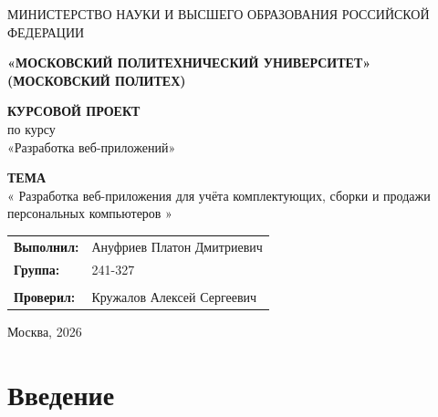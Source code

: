 \documentclass[14pt, a4paper]{extarticle}
\newcommand{\theme}{%
    Разработка веб-приложения для учёта комплектующих,
    сборки и продажи персональных компьютеров%
}
\newcommand{\subject}{Разработка веб-приложений}
\newcommand{\student}{Ануфриев Платон Дмитриевич}
\newcommand{\group}{241-327}
\newcommand{\teacher}{Кружалов Алексей Сергеевич}
\begin{document}
\thispagestyle{empty}

\begin{center}
    {\small МИНИСТЕРСТВО НАУКИ И ВЫСШЕГО ОБРАЗОВАНИЯ РОССИЙСКОЙ ФЕДЕРАЦИИ}
    
    
    {\small \textbf{«МОСКОВСКИЙ ПОЛИТЕХНИЧЕСКИЙ УНИВЕРСИТЕТ»}} \\
    {\small \textbf{(МОСКОВСКИЙ ПОЛИТЕХ)}}

    \vspace{4cm}

    {\Large \textbf{КУРСОВОЙ ПРОЕКТ}} \\[1cm]
    {\large по курсу \\ «\subject»}

    \vspace{1.5cm}

    \textbf{ТЕМА} \\[0.3cm]
    {\large «\theme»}

    \vspace{3cm}

    \hfill
    \begin{tabular}{p{3cm} l}
        \textbf{Выполнил:} & \student \\
        \textbf{Группа:}   & \group \\
        \\
        \textbf{Проверил:}  & \teacher
    \end{tabular}

    \vfill

    Москва, 2026

\end{center}
\newpage


\tableofcontents

\section*{Введение}
\end{document}
